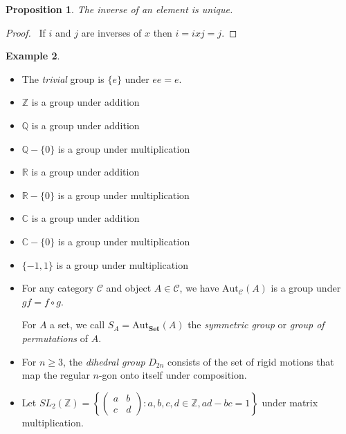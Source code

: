 \documentclass{book}
\let\qed\relax
\newtheorem{prop}{Proposition}[chapter]
\theoremstyle{definition}
\newtheorem{ex}[prop]{Example}
\newcommand{\Aut}[2]{\ensuremath{\mathrm{Aut}_{#1} \left( {#2} \right)}}
\newcommand{\Set}{\ensuremath{\mathbf{Set}}}
\begin{document}
\begin{prop}
    \label{prop:grp-inv-unique}
    The inverse of an element is unique.
\end{prop}

\begin{proof}
    \pf\ If $i$ and $j$ are inverses of $x$ then $i = ixj = j$. \qed
\end{proof}

\begin{ex}
    \begin{itemize}
        \item
              The \emph{trivial} group is $\{e\}$ under $ee = e$.
        \item $\mathbb{Z}$ is a group under addition %
        \item $\mathbb{Q}$ is a group under addition %
        \item $\mathbb{Q} - \{0\}$ is a group under multiplication
        \item $\mathbb{R}$ is a group under addition %
        \item $\mathbb{R} - \{0\}$ is a group under multiplication
        \item $\mathbb{C}$ is a group under addition %
        \item $\mathbb{C} - \{0\}$ is a group under multiplication
        \item $\{-1,1\}$ is a group under multiplication
        \item For any category $\mathcal{C}$ and object $A \in \mathcal{C}$, we have
              $\Aut{\mathcal{C}}{A}$ is a group under $gf = f \circ g$.

              For $A$ a set, we call $S_A = \Aut{\Set}{A}$ the \emph{symmetric group} or
              \emph{group of permutations} of $A$.

        \item For $n \geq 3$, the \emph{dihedral group} $D_{2n}$ consists of the set of rigid
              motions that map the regular $n$-gon onto itself under composition.
              \item Let $SL_2(\mathbb{Z}) = \left\{ \left( \begin{array}{cc}
              a & b \\
              c & d \end{array} \right)
              : a,b,c,d \in \mathbb{Z}, ad - bc = 1 \right\}$ under matrix multiplication.
    \end{itemize}
\end{ex}
\end{document}
